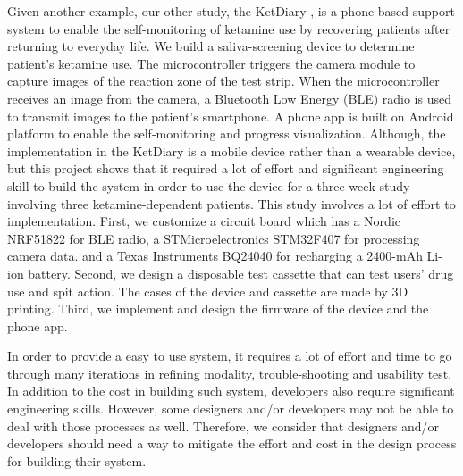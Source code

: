 Given another example, our other study, the KetDiary \cite{You2016Ket}, is a phone-based support system to enable the self-monitoring of ketamine use by recovering patients after returning to everyday life. 
We build a saliva-screening device to determine patient's ketamine use.
The microcontroller triggers the camera module to capture images of the reaction zone of the test strip. When the microcontroller receives an image from the camera, a Bluetooth Low Energy (BLE) radio is used to transmit images to the patient's smartphone. 
A phone app is built on Android platform to enable the self-monitoring and progress visualization. 
Although, the implementation in the KetDiary is a mobile device rather than a wearable device, but this project shows that it required a lot of effort and significant engineering skill to build the system in order to use the device for a three-week study involving three ketamine-dependent patients.
This study involves a lot of effort to implementation. First, we customize a circuit board which has a Nordic NRF51822 for BLE radio, a STMicroelectronics STM32F407 for processing camera data. and a Texas Instruments BQ24040 for recharging a 2400-mAh Li-ion battery. Second, we design a disposable test cassette that can test users' drug use and spit action. The cases of the device and cassette are made by 3D printing. Third, we implement and design the firmware of the device and the phone app. 

In order to provide a easy to use system, it requires a lot of effort and time to go through many iterations in refining modality, trouble-shooting and usability test.
In addition to the cost in building such system, developers also require significant engineering skills. However, some designers and/or developers may not be able to deal with those processes as well. Therefore, we consider that designers and/or developers should need a way to mitigate the effort and cost in the design process for building their system.


